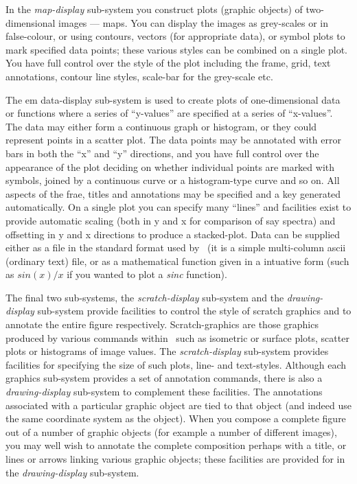 In the {\em map-display} sub-system you construct plots (graphic objects)
of two-dimensional images --- maps.  You can display the images as 
grey-scales or in false-colour, or using contours, 
vectors (for appropriate data), or symbol plots to mark specified 
data points; these various styles can be combined on a single plot.
You have full control over the style of the plot including the frame,
grid, text annotations, contour line styles, scale-bar for the grey-scale
etc.

The {em data-display} sub-system is used to create plots of 
one-dimensional data or functions where a series of ``y-values''
are specified at a series of ``x-values''.  The data may either
form a continuous graph or histogram, or they could represent points
in a scatter plot.  The data points may be annotated with error bars
in both the ``x'' and ``y'' directions, and you have full control over
the appearance of the plot deciding on whether individual points are
marked with symbols, joined by a continuous curve or a histogram-type
curve and so on.  All aspects of the frae, titles and annotations may
be specified and a key generated automatically.  On a single plot
you can specify many ``lines'' and facilities exist to provide automatic
scaling (both in y and x for comparison of say spectra) and offsetting
in y and x directions to produce a stacked-plot.  Data can be supplied
either as a file in the standard format used by \Anmap\ (it is a simple
multi-column ascii (ordinary text) file, or as a mathematical
function given in a intuative form (such as $sin(x)/x$ if you wanted to
plot a {\em sinc} function).  

The final two sub-systems, the {\em scratch-display} sub-system and 
the {\em drawing-display} sub-system provide facilities to control
the style of scratch graphics and to annotate the entire figure 
respectively.  Scratch-graphics are those graphics produced by 
various commands within \Anmap\ such as isometric or surface plots,
scatter plots or histograms of image values.  The {\em scratch-display}
sub-system provides facilities for specifying the size of such plots,
line- and text-styles.  Although each graphics sub-system provides
a set of annotation commands, there is also a {\em drawing-display}
sub-system to complement these facilities.  The annotations associated
with a particular graphic object are tied to that object (and indeed
use the same coordinate system as the object).  When you compose
a complete figure out of a number of graphic objects (for example a
number of different images), you may well wish to annotate the complete
composition perhaps with a title, or lines or arrows linking
various graphic objects; these facilities are provided for in the
{\em drawing-display} sub-system.

